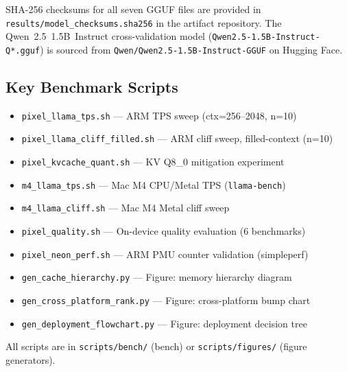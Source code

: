 \documentclass[conference]{IEEEtran}
\begin{document}
\begin{center}
\end{center}

SHA-256 checksums for all seven GGUF files are provided in
\texttt{results/model\_checksums.sha256} in the artifact repository.
The Qwen~2.5~1.5B~Instruct cross-validation model (\texttt{Qwen2.5-1.5B-Instruct-Q*.gguf})
is sourced from \texttt{Qwen/Qwen2.5-1.5B-Instruct-GGUF} on Hugging Face.

\subsection{Key Benchmark Scripts}

{\small
\begin{itemize}[nosep]
  \item \texttt{pixel\_llama\_tps.sh} --- ARM TPS sweep (ctx=256--2048, n=10)
  \item \texttt{pixel\_llama\_cliff\_filled.sh} --- ARM cliff sweep, filled-context (n=10)
  \item \texttt{pixel\_kvcache\_quant.sh} --- KV Q8\_0 mitigation experiment
  \item \texttt{m4\_llama\_tps.sh} --- Mac M4 CPU/Metal TPS (\texttt{llama-bench})
  \item \texttt{m4\_llama\_cliff.sh} --- Mac M4 Metal cliff sweep
  \item \texttt{pixel\_quality.sh} --- On-device quality evaluation (6 benchmarks)
  \item \texttt{pixel\_neon\_perf.sh} --- ARM PMU counter validation (simpleperf)
  \item \texttt{gen\_cache\_hierarchy.py} --- Figure: memory hierarchy diagram
  \item \texttt{gen\_cross\_platform\_rank.py} --- Figure: cross-platform bump chart
  \item \texttt{gen\_deployment\_flowchart.py} --- Figure: deployment decision tree
\end{itemize}
All scripts are in \texttt{scripts/bench/} (bench) or \texttt{scripts/figures/} (figure generators).
}
\end{document}
